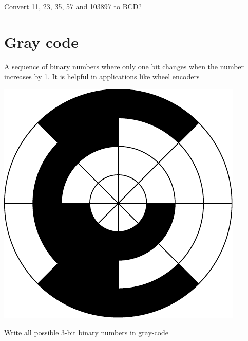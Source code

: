 \begin{prob}
  Convert 11, 23, 35, 57 and 103897 to BCD?
\end{prob}
\vspace{10em}

\section{Gray code}
A sequence of binary numbers where only one bit changes when the number
increases by 1. It is helpful in applications like wheel encoders

\includegraphics[width=0.5\linewidth]{gray-code.pdf}

\begin{prob}
  Write all possible 3-bit binary numbers in gray-code
\end{prob}
\vspace{10em}